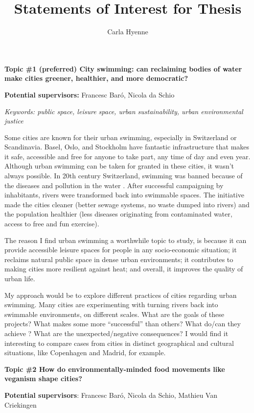 \documentclass{article}
\title{Statements of Interest for Thesis}
\author{Carla Hyenne}
\date{}
\begin{document}
\maketitle

\textbf{Topic \#1 (preferred) City swimming: can reclaiming bodies of water make cities greener, healthier, and more democratic?}

\textbf{Potential supervisors:} Francesc Baró, Nicola da Schio

\textit{Keywords: public space, leisure space, urban sustainability, urban environmental justice}

Some cities are known for their urban swimming, especially in Switzerland or Scandinavia. Basel, Oslo, and Stockholm have fantastic infrastructure that makes it safe, accessible and free for anyone to take part, any time of day and even year. Although urban swimming can be taken for granted in these cities, it wasn't always possible. 
In 20th century Switzerland, swimming was banned because of the diseases and pollution in the water \parencite{ammann_2017}. 
After successful campaigning by inhabitants, rivers were transformed back into swimmable spaces. The initiative made the cities cleaner (better sewage systems, no waste dumped into rivers) and the population healthier (less diseases originating from contaminated water, access to free and fun exercise).

The reason I find urban swimming a worthwhile topic to study, is because it can provide accessible leisure spaces for people in any socio-economic situation; it reclaims natural public space in dense urban environments; it contributes to making cities more resilient against heat; and overall, it improves the quality of urban life.

My approach would be to explore different practices of cities regarding urban swimming. Many cities are experimenting with turning rivers back into swimmable environments, on different scales. What are the goals of these projects? What makes some more ``successful'' than others? What do/can they achieve ? What are the unexpected/negative consequences?
I would find it interesting to compare cases from cities in distinct geographical and cultural situations, like Copenhagen and Madrid, for example.

\textbf{Topic \#2 How do environmentally-minded food movements like veganism shape cities?}

\textbf{Potential supervisors}: Francesc Baró, Nicola da Schio, Mathieu Van Criekingen
\end{document}

